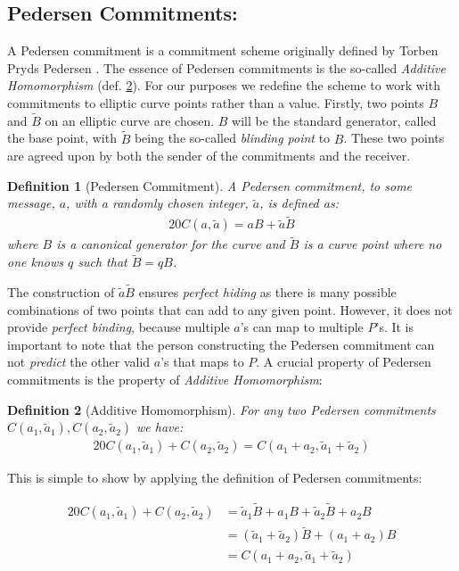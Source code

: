\documentclass{article}
\newtheorem{definition}{Definition}[section]
\newcommand{\eq}[1]{\begin{alignat*}{20}#1\end{alignat*}}
\newcommand{\blind}[1]{\widetilde{#1}}
\newcommand{\ba}{\blind{a}}
\newcommand{\bB}{\blind{B}}
\begin{document}
\subsection{Pedersen Commitments:} \label{pedersen-commitments}

A Pedersen commitment is a commitment scheme originally defined by
Torben Pryds Pedersen \cite{pedersen}. The essence of Pedersen
commitments is the so-called \textit{Additive Homomorphism}
(def. \ref{pedersen-additive-homomorphism}). For our purposes we
redefine the scheme to work with commitments to elliptic curve points
rather than a value. Firstly, two points $B$ and $\bB$ on an elliptic
curve are chosen. $B$ will be the standard generator, called the
base point, with $\bB$ being the so-called \textit{blinding point}
to $B$. These two points are agreed upon by both the sender of the
commitments and the receiver.

\begin{definition}[Pedersen Commitment]
	A Pedersen commitment, to some message, $a$, with a randomly chosen
	integer, $\ba$, is defined as:
	\eq{
		C(a, \ba) = aB + \ba\bB
	}
	where $B$ is a canonical generator for the curve and $\bB$
	is a curve point where no one knows $q$ such that $\bB = qB$.
\end{definition}

The construction of $\ba\bB$ ensures \textit{perfect hiding} as there
is many possible combinations of two points that can add to any given
point. However, it does not provide \textit{perfect binding}, because
multiple $a$'s can map to multiple $P$'s. It is important to note that
the person constructing the Pedersen commitment can not \textit{predict}
the other valid $a$'s that maps to $P$. A crucial property of Pedersen
commitments is the property of \textit{Additive Homomorphism}:

\begin{definition}[Additive Homomorphism] \label{pedersen-additive-homomorphism}
	For any two Pedersen commitments $C(a_1,\ba_1), C(a_2,\ba_2)$ we have:
	\eq{
		C(a_1,\ba_1) + C(a_2,\ba_2) = C(a_1 + a_2, \ba_1 + \ba_2)
	}
\end{definition}

This is simple to show by applying the definition of Pedersen
commitments: 

\eq{
	C(a_1,\ba_1) + C(a_2,\ba_2) &= \ba_1\bB + a_1B  + \ba_2\bB + a_2B \\
	                            &= (\ba_1 + \ba_2)\bB + (a_1 + a_2)B \\
	                            &= C(a_1 + a_2, \ba_1 + \ba_2)
}
\end{document}
